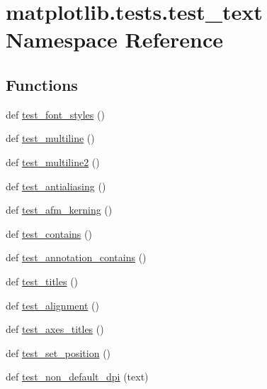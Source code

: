 \hypertarget{namespacematplotlib_1_1tests_1_1test__text}{}\section{matplotlib.\+tests.\+test\+\_\+text Namespace Reference}
\label{namespacematplotlib_1_1tests_1_1test__text}
\subsection*{Functions}
\begin{DoxyCompactItemize}
\item 
def \hyperlink{namespacematplotlib_1_1tests_1_1test__text_a43dabf194506606ace8bda074139bac8}{test\+\_\+font\+\_\+styles} ()
\item 
def \hyperlink{namespacematplotlib_1_1tests_1_1test__text_a0cefa7e887ab90028b480900d6e7d9c5}{test\+\_\+multiline} ()
\item 
def \hyperlink{namespacematplotlib_1_1tests_1_1test__text_a021d45f3c7df638e60260a0dc6fda7ea}{test\+\_\+multiline2} ()
\item 
def \hyperlink{namespacematplotlib_1_1tests_1_1test__text_a925db72befa42438e4b1317cb7dff527}{test\+\_\+antialiasing} ()
\item 
def \hyperlink{namespacematplotlib_1_1tests_1_1test__text_a28621164640f0a521864feaf47ced617}{test\+\_\+afm\+\_\+kerning} ()
\item 
def \hyperlink{namespacematplotlib_1_1tests_1_1test__text_a6528a9906707866cec83e677c1e354bd}{test\+\_\+contains} ()
\item 
def \hyperlink{namespacematplotlib_1_1tests_1_1test__text_a8842e6bae7cf98902094ba03ac194e6d}{test\+\_\+annotation\+\_\+contains} ()
\item 
def \hyperlink{namespacematplotlib_1_1tests_1_1test__text_a548a192a509aff78c3d604eb2f6b801e}{test\+\_\+titles} ()
\item 
def \hyperlink{namespacematplotlib_1_1tests_1_1test__text_a1eb456e0f434b29021d3adb48e14d871}{test\+\_\+alignment} ()
\item 
def \hyperlink{namespacematplotlib_1_1tests_1_1test__text_a4b3775c40c0f3fa1c67d26bfae086cbd}{test\+\_\+axes\+\_\+titles} ()
\item 
def \hyperlink{namespacematplotlib_1_1tests_1_1test__text_a865333565358c9d559832d41b1cd8911}{test\+\_\+set\+\_\+position} ()
\item 
def \hyperlink{namespacematplotlib_1_1tests_1_1test__text_abaf8656405f56b54aec15c19825aa993}{test\+\_\+non\+\_\+default\+\_\+dpi} (text)

\end{DoxyCompactItemize}
